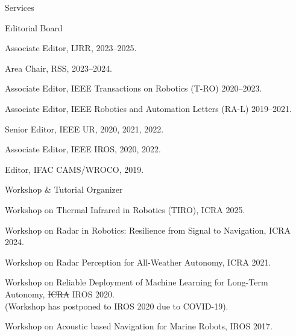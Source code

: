 \begin{rSection}{Services}
\begin{rSubsection}{Editorial Board}{}{}{}
  \item Associate Editor, IJRR, 2023--2025.
  \item Area Chair, RSS, 2023--2024.
  \item Associate Editor, IEEE Transactions on Robotics (T-RO) 2020--2023.
  \item Associate Editor, IEEE Robotics and Automation Letters (RA-L) 2019--2021.
  \item Senior Editor, IEEE UR, 2020, 2021, 2022.
  \item Associate Editor, IEEE IROS, 2020, 2022.
  \item Editor, IFAC CAMS/WROCO, 2019.
\end{rSubsection}

\begin{rSubsection}{Workshop \& Tutorial Organizer}{}{}{}
  \item Workshop on Thermal Infrared in Robotics (TIRO), ICRA 2025.
  \item Workshop on Radar in Robotics: Resilience from Signal to Navigation, ICRA 2024.
  \item Workshop on Radar Perception for All-Weather Autonomy, ICRA 2021.
  \item Workshop on Reliable Deployment of Machine Learning for Long-Term Autonomy, \sout{ICRA} IROS 2020.\\
  (Workshop has postponed to IROS 2020 due to COVID-19).
  \item Workshop on Acoustic based Navigation for Marine Robots, IROS 2017.
\end{rSubsection}


\end{rSection}

